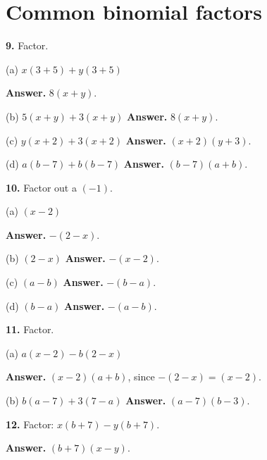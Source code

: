 \documentclass{ximera}
\begin{document}
\section*{Common binomial factors}

\begin{problem}

\textbf{9.} Factor.

(a) $x(3+5)+y(3+5)$ \qquad

\begin{hint}
\textbf{Answer.} $8(x+y)$.

(b) $5(x+y)+3(x+y)$ \qquad \textbf{Answer.} $8(x+y)$.

(c) $y(x+2)+3(x+2)$ \qquad \textbf{Answer.} $(x+2)(y+3)$.

(d) $a(b-7)+b(b-7)$ \qquad \textbf{Answer.} $(b-7)(a+b)$.
\end{hint}
\end{problem}

\begin{problem}

\textbf{10.} Factor out a $(-1)$.

(a) $(x-2)$ \qquad

\begin{hint}
\textbf{Answer.} $-(2-x)$.

(b) $(2-x)$ \qquad \textbf{Answer.} $-(x-2)$.

(c) $(a-b)$ \qquad \textbf{Answer.} $-(b-a)$.

(d) $(b-a)$ \qquad \textbf{Answer.} $-(a-b)$.
\end{hint}
\end{problem}

\begin{problem}

\textbf{11.} Factor.

(a) $a(x-2)-b(2-x)$ \qquad

\begin{hint}
\textbf{Answer.} $(x-2)(a+b)$, since $-(2-x)=(x-2)$.

(b) $b(a-7)+3(7-a)$ \qquad \textbf{Answer.} $(a-7)(b-3)$.
\end{hint}
\end{problem}

\begin{problem}

\textbf{12.} Factor: $x(b+7)-y(b+7)$. \qquad

\begin{hint}
\textbf{Answer.} $(b+7)(x-y)$.
\end{hint}
\end{problem}
\end{document}

